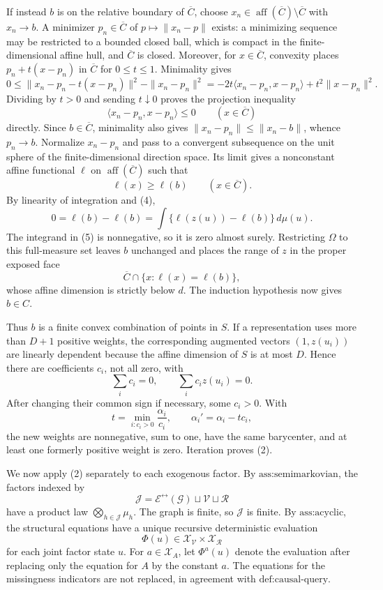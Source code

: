 If instead \(b\) is on the relative boundary of \(\overline C\), choose \(x_n\in\operatorname{aff}(\overline C)\setminus\overline C\) with \(x_n\to b\). A minimizer \(p_n\in\overline C\) of \(p\mapsto\|x_n-p\|\) exists: a minimizing sequence may be restricted to a bounded closed ball, which is compact in the finite-dimensional affine hull, and \(\overline C\) is closed. Moreover, for \(x\in\overline C\), convexity places \(p_n+t(x-p_n)\) in \(\overline C\) for \(0\leq t\leq1\). Minimality gives
\[
0\leq
\|x_n-p_n-t(x-p_n)\|^2-\|x_n-p_n\|^2
=-2t\langle x_n-p_n,x-p_n\rangle+t^2\|x-p_n\|^2.
\]
Dividing by \(t>0\) and sending \(t\downarrow0\) proves the projection inequality
\[
\langle x_n-p_n,x-p_n\rangle\leq0
\qquad(x\in\overline C)
\]
directly. Since \(b\in\overline C\), minimality also gives \(\|x_n-p_n\|\leq\|x_n-b\|\), whence \(p_n\to b\). Normalize \(x_n-p_n\) and pass to a convergent subsequence on the unit sphere of the finite-dimensional direction space. Its limit gives a nonconstant affine functional \(\ell\) on \(\operatorname{aff}(\overline C)\) such that
\[
\ell(x)\geq\ell(b)
\qquad(x\in\overline C).
\tag{4}
\]
By linearity of integration and (4),
\[
0=\ell(b)-\ell(b)
=\int\{\ell(z(u))-\ell(b)\}\,d\mu(u).
\tag{5}
\]
The integrand in (5) is nonnegative, so it is zero almost surely. Restricting \(\Omega\) to this full-measure set leaves \(b\) unchanged and places the range of \(z\) in the proper exposed face
\[
\overline C\cap\{x:\ell(x)=\ell(b)\},
\]
whose affine dimension is strictly below \(d\). The induction hypothesis now gives \(b\in C\).

Thus \(b\) is a finite convex combination of points in \(S\). If a representation uses more than \(D+1\) positive weights, the corresponding augmented vectors \((1,z(u_i))\) are linearly dependent because the affine dimension of \(S\) is at most \(D\). Hence there are coefficients \(c_i\), not all zero, with
\[
\sum_i c_i=0,
\qquad
\sum_i c_i z(u_i)=0.
\]
After changing their common sign if necessary, some \(c_i>0\). With
\[
t=\min_{i:c_i>0}\frac{\alpha_i}{c_i},
\qquad
\alpha_i'=\alpha_i-tc_i,
\]
the new weights are nonnegative, sum to one, have the same barycenter, and at least one formerly positive weight is zero. Iteration proves (2).

We now apply (2) separately to each exogenous factor. By \(\text{ass:semimarkovian}\), the factors indexed by
\[
\mathcal J=\mathcal E^{\leftrightarrow}(\mathcal G)\sqcup\mathcal V\sqcup\mathcal R
\]
have a product law \(\bigotimes_{h\in\mathcal J}\mu_h\). The graph is finite, so \(\mathcal J\) is finite. By \(\text{ass:acyclic}\), the structural equations have a unique recursive deterministic evaluation
\[
\Phi(u)\in\mathcal X_{\mathcal V}\times\mathcal X_{\mathcal R}
\]
for each joint factor state \(u\). For \(a\in\mathcal X_A\), let \(\Phi^a(u)\) denote the evaluation after replacing only the equation for \(A\) by the constant \(a\). The equations for the missingness indicators are not replaced, in agreement with \(\text{def:causal-query}\).

